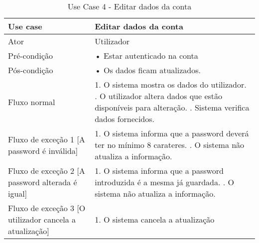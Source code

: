 \documentclass[a4paper,12pt]{scrreprt}
\begin{document}
   \begin{table}[htp]
      \begin{center}
        \begin{tabular}{ | m{11em} | m{10cm} | } 
          \hline
          Use case & Editar dados da conta \\ 
          \hline
          Ator & Utilizador \\ 
          \hline
          Pré-condição & 
          • Estar autenticado na conta \\
          \hline 
          Pós-condição & • Os dados ficam atualizados. \\ 
          \hline
          Fluxo normal &
          1. O sistema mostra os dados do utilizador. \newline
          2. O utilizador altera dados que estão disponíveis para alteração. \newline
          3. Sistema verifica dados fornecidos. \\
          \hline \cellcolor{red!50}
           Fluxo de exceção 1 [A password é inválida] &  
           1. O sistema informa que a password deverá ter no mínimo 8 carateres. \newline
           2. O sistema não atualiza a informação. \\
           \hline
           \cellcolor{red!50}
           Fluxo de exceção 2 [A password alterada é igual] &  
           1. O sistema informa que a password introduzida é a mesma já guardada. \newline
           2. O sistema não atualiza a informação. \\
           \hline
           \cellcolor{red!50}
           Fluxo de exceção 3 [O utilizador cancela a atualização] &  
           1. O sistema cancela a atualização \\ 
           \hline
  \end{tabular}
\end{center}
\label{Tab: usecase4}
\caption{Use Case 4 - Editar dados da conta}
\end{table}
\end{document}
